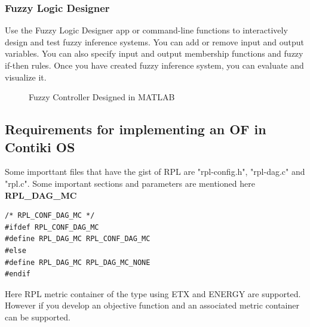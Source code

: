 \subsubsection{Fuzzy Logic Designer} \label{Fuzzy Logic Designer}
Use the Fuzzy Logic Designer app or command-line functions to interactively design and test fuzzy inference systems. You can add or remove input and output variables. You can also specify input and output membership functions and fuzzy if-then rules. Once you have created fuzzy inference system, you can evaluate and visualize it.
\begin{figure}[h!]
\centering
{}
\caption{Fuzzy Controller Designed in MATLAB}
\label{fig:method}
\end{figure}
\subsection{Requirements for implementing an OF in Contiki OS} \label{Requirements for implementing an OF in Contiki OS}
Some importtant files that have the gist of RPL are "rpl-config.h", "rpl-dag.c" and "rpl.c". Some important sections and parameters are mentioned here\\
\noindent\textbf{RPL\_DAG\_MC}
\begin{verbatim}
/* RPL_CONF_DAG_MC */
#ifdef RPL_CONF_DAG_MC
#define RPL_DAG_MC RPL_CONF_DAG_MC
#else
#define RPL_DAG_MC RPL_DAG_MC_NONE
#endif
\end{verbatim}
Here RPL metric container of the type using ETX and ENERGY are supported. However if you develop an objective function and an associated metric container can be supported.\\

